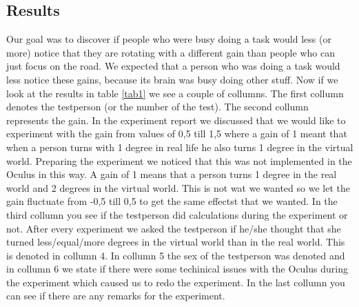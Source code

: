 \subsection{Results}
Our goal was to discover if people who were busy doing a task would less (or more) notice that they are rotating with a different gain than people who can just focus on the road. 
We expected that a person who was doing a task would less notice these gains, because its brain was busy doing other stuff. 
Now if we look at the results in table \ref{tab1} we see a couple of collumns. 
The first collumn denotes the testperson (or the number of the test). 
The second collumn represents the gain. 
In the experiment report we discussed that we would like to experiment with the gain from values of 0,5 till 1,5 where a gain of 1 meant that when a person turns with 1 degree in real life he also turns 1 degree in the virtual world. 
Preparing the experiment we noticed that this was not implemented in the Oculus in this way. 
A gain of 1 means that a person turns 1 degree in the real world and 2 degrees in the virtual world. 
This is not wat we wanted so we let the gain fluctuate from -0,5 till 0,5 to get the same effectst that we wanted. 
In the third collumn you see if the testperson did calculations during the experiment or not. 
After every experiment we asked the testperson if he/she thought that she turned less/equal/more degrees in the virtual world than in the real world. 
This is denoted in collumn 4. In collumn 5 the sex of the testperson was denoted and in collumn 6 we state if there were some techinical issues with the Oculus during the experiment which caused us to redo the experiment. 
In the last collumn you can see if there are any remarks for the experiment.

